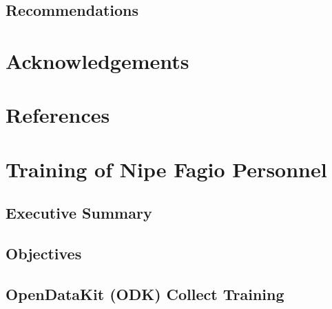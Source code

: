 \documentclass[a4paper,12pt,twoside]{article}
\begin{document}
\subsection{Recommendations}

\begin{multicols}{2}
\lipsum[0-5]
\end{multicols}

\section{Acknowledgements}

\begin{multicols}{2}
\lipsum[0-5]
\end{multicols}

\section{References}

\begin{multicols}{2}
\lipsum[0-5]
\end{multicols}

\section{Training of Nipe Fagio Personnel}

\begin{multicols}{2}
\lipsum[0-5]
\end{multicols}

\subsection{Executive Summary}

\begin{multicols}{2}
\lipsum[0-5]
\end{multicols}

\subsection{Objectives}

\begin{multicols}{2}
\lipsum[0-5]
\end{multicols}

\subsection{OpenDataKit (ODK) Collect Training}
\end{document}
